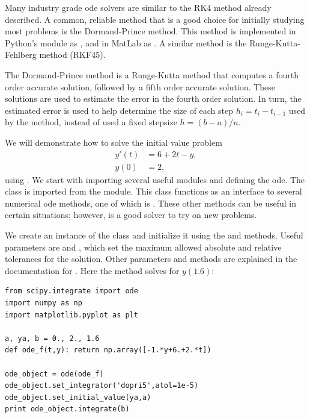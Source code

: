 \label{lab:SIRModels}

Many industry grade ode solvers are similar to the RK4 method already described. A common, reliable method that is a good choice for initially studying most problems is the Dormand-Prince method. This method is implemented in Python's  module as , and in MatLab as . A similar method is the Runge-Kutta-Fehlberg method (RKF45). 

The Dormand-Prince method is a Runge-Kutta method that computes a fourth order accurate solution, followed by a fifth order accurate solution. These solutions are used to estimate the error in the fourth order solution. In turn, the estimated error is used to help determine the size of each step $h_i = t_i-t_{i-1}$ used by the method, instead of used a fixed stepsize $h = (b-a)/n$. 

We will demonstrate how to solve the initial value problem
\begin{align*}
y'(t) &= 6+2t-y, \\
y(0) &= 2,
\end{align*}
using . We start with importing several useful modules and defining the ode. 
The  class is imported from the  module. 
This class functions as an interface to several numerical ode methods, one of which is . 
These other methods can be useful in certain situations; however,  is a good solver to try on new problems. 



We create an instance of the  class and initialize it using the  and  methods. 
Useful parameters are  and , which set the maximum allowed absolute and relative tolerances for the solution. 
Other parameters and methods are explained in the documentation for .  
Here the method solves for $y(1.6)$:

\begin{lstlisting}
from scipy.integrate import ode
import numpy as np
import matplotlib.pyplot as plt

a, ya, b = 0., 2., 1.6
def ode_f(t,y): return np.array([-1.*y+6.+2.*t])

ode_object = ode(ode_f)
ode_object.set_integrator('dopri5',atol=1e-5) 
ode_object.set_initial_value(ya,a) 
print ode_object.integrate(b)
\end{lstlisting}

